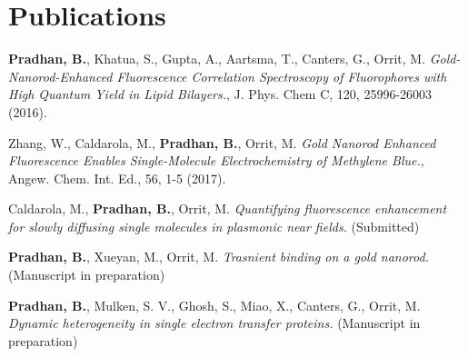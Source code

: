 \chapter*{Publications}
\label{ch:Publications}

\begin{etaremune}{%

	\item \textbf{Pradhan, B.}, Khatua, S., Gupta, A., Aartsma, T., Canters, G., Orrit, M. \textit{Gold-Nanorod-Enhanced Fluorescence Correlation Spectroscopy of Fluorophores with High Quantum Yield in Lipid Bilayers.}, J. Phys. Chem C, 120, 25996-26003 (2016).
	
	\item Zhang, W., Caldarola, M., \textbf{Pradhan, B.}, Orrit, M. \textit{Gold Nanorod Enhanced Fluorescence Enables Single-Molecule Electrochemistry of Methylene Blue.}, Angew. Chem. Int. Ed., 56, 1-5 (2017).

	\item Caldarola, M., \textbf{Pradhan, B.}, Orrit, M. \textit{Quantifying fluorescence enhancement for slowly diffusing single molecules in plasmonic near fields.} (Submitted)

	\item \textbf{Pradhan, B.}, Xueyan, M., Orrit, M. \textit{Trasnient binding on a gold nanorod.} (Manuscript in preparation)

	\item \textbf{Pradhan, B.}, Mulken, S. V., Ghosh, S., Miao, X., Canters, G., Orrit, M. \textit{Dynamic heterogeneity in single electron transfer proteins.} (Manuscript in preparation)


}\end{etaremune}
